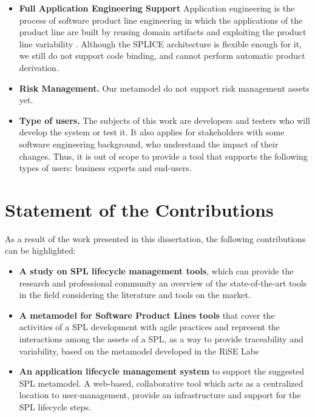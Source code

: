 \begin{itemize}
  \item \textbf{ Full Application Engineering Support } Application engineering is the process of software product line engineering in which the applications of the product line are built by reusing domain artifacts and exploiting the product line variability \citep{Pohl2005}. Although the SPLICE architecture is flexible enough for it, we still do not support code binding, and cannot perform automatic product derivation.  
  
    \item \textbf{Risk Management.} Our metamodel do not support risk management assets yet.
    
    
  \item \textbf{Type of users.} The subjects of this work are
  developers and testers who will develop the system or test it. It also applies for stakeholders with some software engineering background, who understand the impact of their changes. Thus, it is out of scope  to provide a tool that supports the following types of users: business experts and end-users.
\end{itemize}

\section{Statement of the Contributions}
\label{sc:contributions}
As a result of the work presented in this dissertation, the following
contributions can be highlighted:
\begin{itemize}
\item \textbf{A study on SPL lifecycle management tools}, which can provide the research and professional community an overview of the state-of-the-art tools in the field considering the literature and tools on the market.


\item \textbf{A metamodel for Software Product Lines tools} that cover the activities of a \ac{SPL} development with agile practices and represent the interactions among the assets of a \ac{SPL}, as a way to provide traceability and variability, based on the metamodel developed in the \ac{RiSE} Labs \citep{Cavalcanti:2011}


\item \textbf{An application lifecycle management system} to support the suggested \ac{SPL} metamodel. A web-based, collaborative tool which acts as a centralized location to user-management, provide an infrastructure and support for the \ac{SPL} lifecycle steps.

\end{itemize}



